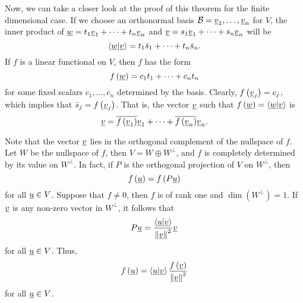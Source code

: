 Now, we can take a closer look at the proof of this theorem for the finite dimensional case.
If we choose an orthonormal basis $\mathcal{B} = \underline{v}_1, \ldots, \underline{v}_n$ for $V$, the inner product of $\underline{w} = t_1 \underline{v}_1 + \cdots + t_n \underline{v}_n$ and $\underline{v} = s_1 \underline{v}_1 + \cdots + s_n \underline{v}_n$ will be
\begin{equation*}
\left\langle \underline{w} | \underline{v} \right\rangle = t_1 \bar{s}_1 + \cdots + t_n \bar{s}_n .
\end{equation*}
If $f$ is a linear functional on $V$, then $f$ has the form
\begin{equation*}
f \left(\underline{w}\right) = c_1 t_1 + \cdots + c_n t_n
\end{equation*}
for some fixed scalars $c_1, \ldots, c_n$ determined by the basis.
Clearly, $f \left( \underline{v}_j \right) = c_j$, which implies that $\bar{s}_j = f \left( \underline{v}_j \right)$.
That is, the vector $\underline{v}$ such that $f \left( \underline{w} \right) = \left\langle \underline{w} | \underline{v} \right\rangle$ is
\begin{equation*}
\underline{v} = \overline{ f \left( \underline{v}_1 \right) } \underline{v}_1 + \cdots + \overline{ f \left( \underline{v}_n \right) } \underline{v}_n .
\end{equation*}

Note that the vector $\underline{v}$ lies in the orthogonal complement of the nullspace of $f$.
Let $W$ be the nullspace of $f$, then $V = W \oplus W^{\bot}$, and $f$ is completely determined by its value on $W^{\bot}$.
In fact, if $P$ is the orthogonal projection of $V$ on $W^{\bot}$, then
\begin{equation*}
f \left( \underline{u} \right) = f \left( P \underline{u} \right)
\end{equation*}
for all $\underline{u} \in V$.
Suppose that $f \neq 0$, then $f$ is of rank one and $\dim \left( W^{\bot} \right) = 1$.
If $\underline{v}$ is any non-zero vector in $W^{\bot}$, it follows that
\begin{equation*}
P \underline{u} = \frac{ \left\langle \underline{u} | \underline{v} \right\rangle }{ \left\| \underline{v} \right\|^2 } \underline{v}
\end{equation*}
for all $\underline{u} \in V$.
Thus,
\begin{equation*}
f \left( \underline{u} \right) = \left\langle \underline{u} | \underline{v} \right\rangle
\frac{f \left( \underline{v} \right) }{ \left\| \underline{v} \right\|^2 }
\end{equation*}
for all $\underline{u} \in V$.


